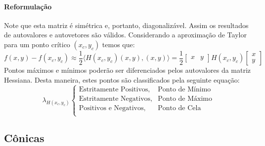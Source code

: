\documentclass{article}
\begin{document}
            \paragraph{Reformulação}Note que esta matriz é simétrica e, portanto, diagonalizável. Assim os resultados de autovalores e autovetores são válidos. Considerando a aproximação de Taylor para um ponto crítico $(x_{c}, y_{c})$ temos que:
                \[
                    f(x, y) - f(x_{c}, y_{c}) \approx \frac{1}{2} \langle H(x_{c}, y_{c}) (x, y), (x, y) \rangle
                                              = \frac{1}{2}
                                              \begin{bmatrix} x & y \end{bmatrix}
                                              H(x_{c}, y_{c})
                                              \begin{bmatrix} x \\ y\end{bmatrix}\]
            Pontos máximos e mínimos poderão ser diferenciados pelos autovalores da matriz Hessiana. Desta maneira, estes pontos são classificados pela seguinte equação:
                \[
                    \lambda_{H(x_{c}, y_{c})}
                    \begin{cases}
                        \text{Estritamente Positivos}, & \text{Ponto de Mínimo}\\
                        \text{Estritamente Negativos}, & \text{Ponto de Máximo}\\
                        \text{Positivos e Negativos},  & \text{Ponto de Cela}\\
                    \end{cases}
                \]

        \subsection{Cônicas}
\end{document}
